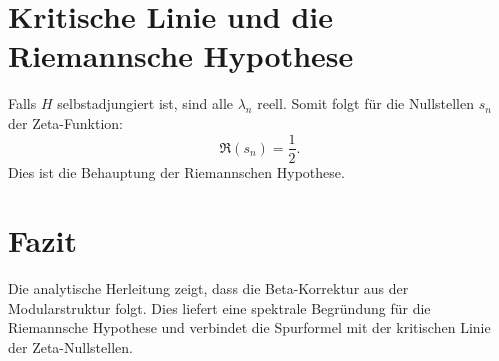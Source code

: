 \documentclass[a4paper,11pt]{article}
\begin{document}
\section{Kritische Linie und die Riemannsche Hypothese}
Falls \( H \) selbstadjungiert ist, sind alle \( \lambda_n \) reell. Somit folgt für die Nullstellen \( s_n \) der Zeta-Funktion:
\begin{equation}
\Re(s_n) = \frac{1}{2}.
\end{equation}
Dies ist die Behauptung der Riemannschen Hypothese.

\section{Fazit}
Die analytische Herleitung zeigt, dass die Beta-Korrektur aus der Modularstruktur folgt. Dies liefert eine spektrale Begründung für die Riemannsche Hypothese und verbindet die Spurformel mit der kritischen Linie der Zeta-Nullstellen.
\end{document}
